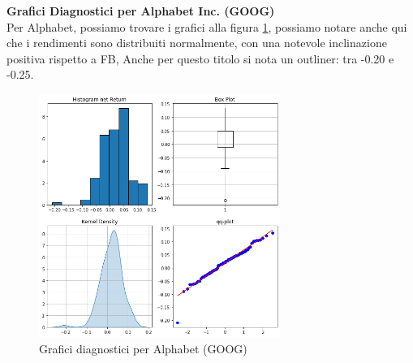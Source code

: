 \documentclass{article}
\begin{document}
\textbf{Grafici Diagnostici per Alphabet Inc. (GOOG)}\\
Per Alphabet, possiamo trovare i grafici alla figura \ref{fig:goog_diagn}, possiamo notare anche qui che i rendimenti sono distribuiti normalmente, con una notevole inclinazione positiva rispetto a FB,
Anche per questo titolo si nota un outliner: tra -0.20 e -0.25.

\begin{figure}[h]
  \centering
  \includegraphics[width=0.7\textwidth]{goog_tecn.png}
  \caption{Grafici diagnostici per Alphabet (GOOG)}
  \label{fig:goog_diagn}
\end{figure}



\nocite{*}
\end{document}
